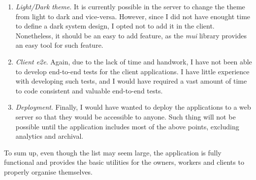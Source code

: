 \documentclass[a4paper, 12pt, oneside]{book}
\begin{document}
\begin{enumerate}[label = -]
	\item \emph{Light/Dark theme}. It is currently possible in the server to change the theme from light to dark and vice-versa. However, since I did not have enought time to define a dark system design, I opted not to add it in the client. Nonetheless, it should be an easy to add feature, as the \emph{mui} library provides an easy tool for such feature.
	\item \emph{Client e2e}. Again, due to the lack of time and handwork, I have not been able to develop end-to-end tests for the client applications. I have little experience with developing such tests, and I would have required a vast amount of time to code consistent and valuable end-to-end tests.
	\item \emph{Deployment}. Finally, I would have wanted to deploy the applications to a web server so that they would be accessible to anyone. Such thing will not be possible until the application includes most of the above points, excluding analytics and archival.
\end{enumerate}
To sum up, even though the list may seem large, the application is fully functional and provides the basic utilities for the owners, workers and clients to properly organise themselves.
\end{document}
